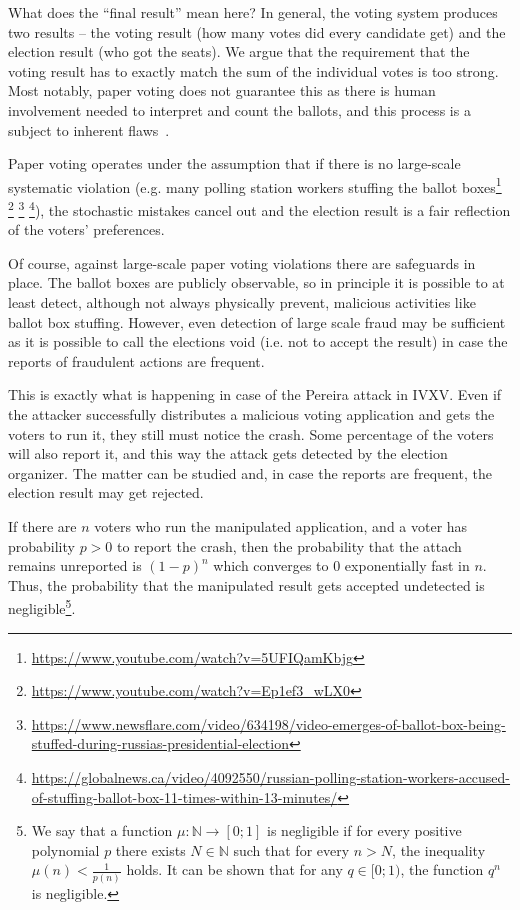 \documentclass{llncs}
\newcommand{\footurl}[1]{\footnote{\url{#1}}}
\newcommand{\N}{\mathbb{N}}
\begin{document}
What does the ``final result'' mean here? In general, the voting system produces two results -- the voting result (how many votes did every candidate get) and the election result (who got the seats). We argue that the requirement that the voting result has to exactly match the sum of the individual votes is too strong. Most notably, paper voting does not guarantee this as there is human involvement needed to interpret and count the ballots, and this process is a subject to inherent flaws~\cite{goggin2012post}. 

Paper voting operates under the assumption that if there is no large-scale systematic violation (e.g. many polling station workers stuffing the ballot boxes\footurl{https://www.youtube.com/watch?v=5UFIQamKbjg} \footurl{https://www.youtube.com/watch?v=Ep1ef3_wLX0} \footurl{https://www.newsflare.com/video/634198/video-emerges-of-ballot-box-being-stuffed-during-russias-presidential-election} \footurl{https://globalnews.ca/video/4092550/russian-polling-station-workers-accused-of-stuffing-ballot-box-11-times-within-13-minutes/}), the stochastic mistakes cancel out and the election result is a fair reflection of the voters' preferences.

Of course, against large-scale paper voting violations there are safeguards in place. The ballot boxes are publicly observable, so in principle it is possible to at least detect, although not always physically prevent, malicious activities like ballot box stuffing. However, even detection of large scale fraud may be sufficient as it is possible to call the elections void (i.e. not to accept the result) in case the reports of fraudulent actions are frequent.

This is exactly what is happening in case of the Pereira attack in IVXV. Even if the attacker successfully distributes a malicious voting application and gets the voters to run it, they still must notice the crash. Some percentage of the voters will also report it, and this way the attack gets detected by the election organizer. The matter can be studied and, in case the reports are frequent, the election result may get rejected.

If there are $n$ voters who run the manipulated application, and a voter has probability $p>0$ to report the crash, then the probability that the attach remains unreported is $(1-p)^n$ which converges to $0$ exponentially fast in $n$. Thus, the probability that the manipulated result gets accepted undetected is negligible\footnote{We say that a function $\mu:\N\to[0;1]$ is negligible if for every positive polynomial $p$ there exists $N\in\N$ such that for every $n>N$, the inequality $\mu(n)<\frac{1}{p(n)}$ holds. It can be shown that for any $q\in[0;1)$, the function $q^n$ is negligible.}. 
\end{document}
